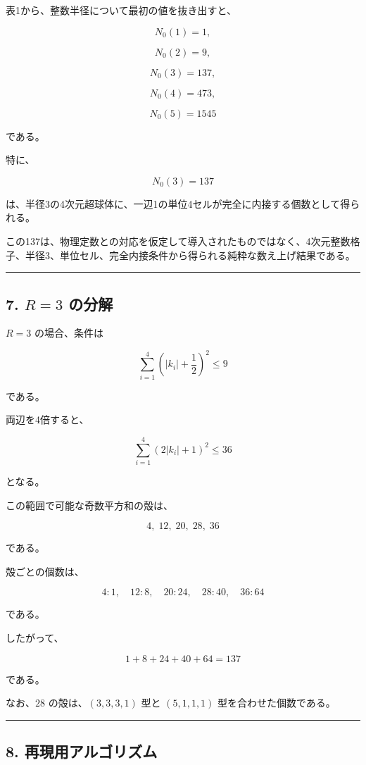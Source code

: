 \documentclass[
]{ltjsarticle}
\begin{document}
表1から、整数半径について最初の値を抜き出すと、

\[
N_0(1)=1,
\]

\[
N_0(2)=9,
\]

\[
N_0(3)=137,
\]

\[
N_0(4)=473,
\]

\[
N_0(5)=1545
\]

である。

特に、

\[
N_0(3)=137
\]

は、半径3の4次元超球体に、一辺1の単位4セルが完全に内接する個数として得られる。

この137は、物理定数との対応を仮定して導入されたものではなく、4次元整数格子、半径3、単位セル、完全内接条件から得られる純粋な数え上げ結果である。

\begin{center}\rule{0.5\linewidth}{0.5pt}\end{center}

\subsection{\texorpdfstring{7. \(R=3\)
の分解}{7. R=3 の分解}}\label{r3-ux306eux5206ux89e3}

\(R=3\) の場合、条件は

\[
\sum_{i=1}^{4}
\left(|k_i|+\frac12\right)^2
\le 9
\]

である。

両辺を4倍すると、

\[
\sum_{i=1}^{4}
(2|k_i|+1)^2
\le 36
\]

となる。

この範囲で可能な奇数平方和の殻は、

\[
4,\;12,\;20,\;28,\;36
\]

である。

殻ごとの個数は、

\[
4:1,\quad
12:8,\quad
20:24,\quad
28:40,\quad
36:64
\]

である。

したがって、

\[
1+8+24+40+64=137
\]

である。

なお、\(28\) の殻は、\((3,3,3,1)\) 型と \((5,1,1,1)\)
型を合わせた個数である。

\begin{center}\rule{0.5\linewidth}{0.5pt}\end{center}

\subsection{8.
再現用アルゴリズム}\label{ux518dux73feux7528ux30a2ux30ebux30b4ux30eaux30baux30e0}
\end{document}

